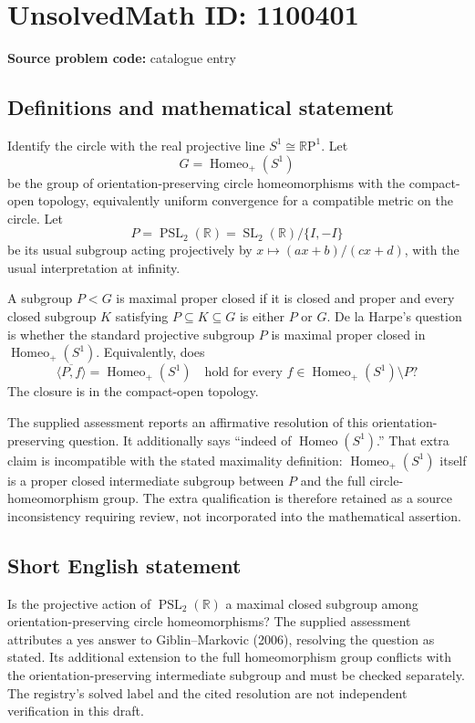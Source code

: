 \documentclass[11pt]{article}
\newcommand{\R}{\mathbb{R}}
\begin{document}
\section*{UnsolvedMath ID: 1100401}
\textbf{Source problem code:} catalogue entry
\subsection{Definitions and mathematical statement}
Identify the circle with the real projective line $S^1\cong\R\mathrm P^1$. Let
\[
 G=\operatorname{Homeo}_+(S^1)
\]
be the group of orientation-preserving circle homeomorphisms with the compact-open topology, equivalently uniform convergence for a compatible metric on the circle. Let
\[
 P=\operatorname{PSL}_2(\R)=\operatorname{SL}_2(\R)/\{I,-I\}
\]
be its usual subgroup acting projectively by $x\mapsto(ax+b)/(cx+d)$, with the usual interpretation at infinity.

A subgroup $P<G$ is maximal proper closed if it is closed and proper and every closed subgroup $K$ satisfying $P\subseteq K\subseteq G$ is either $P$ or $G$. De la Harpe's question is whether the standard projective subgroup $P$ is maximal proper closed in $\operatorname{Homeo}_+(S^1)$. Equivalently, does
\[
 \overline{\langle P,f\rangle}=\operatorname{Homeo}_+(S^1)
 \quad\text{hold for every }f\in\operatorname{Homeo}_+(S^1)\setminus P?
\]
The closure is in the compact-open topology.

The supplied assessment reports an affirmative resolution of this orientation-preserving question. It additionally says ``indeed of $\operatorname{Homeo}(S^1)$.'' That extra claim is incompatible with the stated maximality definition: $\operatorname{Homeo}_+(S^1)$ itself is a proper closed intermediate subgroup between $P$ and the full circle-homeomorphism group. The extra qualification is therefore retained as a source inconsistency requiring review, not incorporated into the mathematical assertion.
\subsection{Short English statement}
Is the projective action of $\operatorname{PSL}_2(\R)$ a maximal closed subgroup among orientation-preserving circle homeomorphisms? The supplied assessment attributes a yes answer to Giblin--Markovic (2006), resolving the question as stated. Its additional extension to the full homeomorphism group conflicts with the orientation-preserving intermediate subgroup and must be checked separately. The registry's solved label and the cited resolution are not independent verification in this draft.
\end{document}
